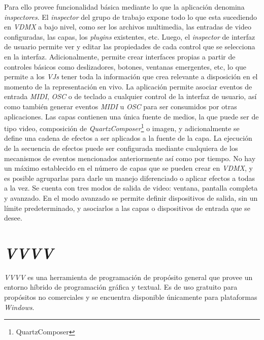 Para ello provee funcionalidad básica mediante lo que la aplicación denomina \emph{inspectores}. El \emph{inspector} del grupo de trabajo expone todo lo que esta sucediendo en \emph{VDMX} a bajo nivel, como ser los archivos multimedia, las entradas de video configuradas, las capas, los \emph{plugins} existentes, etc. Luego, el \emph{inspector} de interfaz de usuario permite ver y editar las propiedades de cada control que se selecciona en la interfaz. Adicionalmente, permite crear interfaces propias a partir de controles básicos como deslizadores, botones, ventanas emergentes, etc, lo que permite a los \emph{VJs} tener toda la información que crea relevante a disposición en el momento de la representación en vivo.
La aplicación permite asociar eventos de entrada \emph{MIDI}, \emph{OSC} o de teclado a cualquier control de la interfaz de usuario, así como también generar eventos \emph{MIDI} u \emph{OSC} para ser consumidos por otras aplicaciones.
Las capas contienen una única fuente de medios, la que puede ser de tipo video, composición de \emph{QuartzComposer}\footnote{QuartzComposer} o imagen, y adicionalmente se define una cadena de efectos a ser aplicados a la fuente de la capa. La ejecución de la secuencia de efectos puede ser configurada mediante cualquiera de los mecanismos de eventos mencionados anteriormente así como por tiempo. No hay un máximo establecido en el número de capas que se pueden crear en \emph{VDMX}, y es posible agruparlas para darle un manejo diferenciado o aplicar efectos a todas a la vez.
Se cuenta con tres modos de salida de video: ventana, pantalla completa y avanzado. En el modo avanzado se permite definir dispositivos de salida, sin un límite predeterminado, y asociarlos a las capas o dispositivos de entrada que se desee.

\section{\emph{VVVV}}
\emph{VVVV}\cite{VVVV} es una herramienta de programación de propósito general que provee un entorno híbrido de programación gráfica y textual. Es de uso gratuito para propósitos no comerciales y se encuentra disponible únicamente para plataformas \emph{Windows}.

